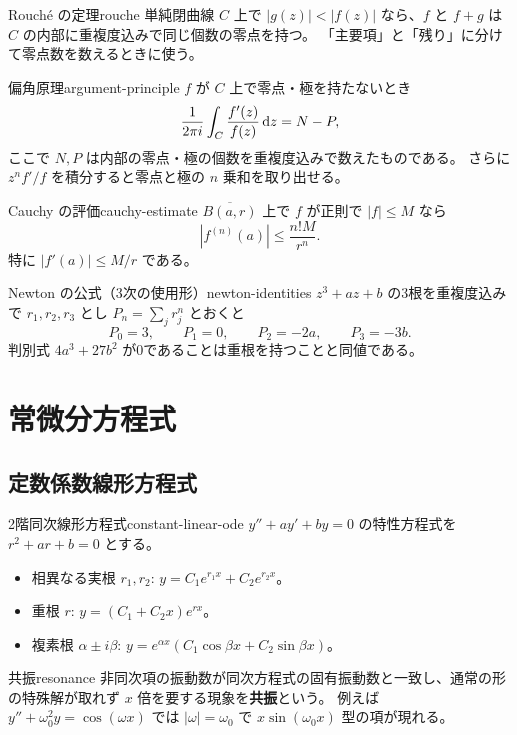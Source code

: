 \begin{theorem}{Rouché の定理}{rouche}
単純閉曲線 $C$ 上で $|g(z)|<|f(z)|$ なら、$f$ と $f+g$ は $C$ の内部に重複度込みで同じ個数の零点を持つ。
「主要項」と「残り」に分けて零点数を数えるときに使う。
\end{theorem}

\begin{theorem}{偏角原理}{argument-principle}
$f$ が $C$ 上で零点・極を持たないとき
\[
 \frac1{2\pi i}\int_C\frac{f'(z)}{f(z)}\,\mathrm{d} z=N-P,
\]
ここで $N,P$ は内部の零点・極の個数を重複度込みで数えたものである。
さらに $z^n f'/f$ を積分すると零点と極の $n$ 乗和を取り出せる。
\end{theorem}

\begin{theorem}{Cauchy の評価}{cauchy-estimate}
$\overline{B(a,r)}$ 上で $f$ が正則で $|f|\le M$ なら
\[
 |f^{(n)}(a)|\le\frac{n!M}{r^n}.
\]
特に $|f'(a)|\le M/r$ である。
\end{theorem}

\begin{proposition}{Newton の公式（3次の使用形）}{newton-identities}
$z^3+az+b$ の3根を重複度込みで $r_1,r_2,r_3$ とし $P_n=\sum_jr_j^n$ とおくと
\[
 P_0=3,\qquad P_1=0,\qquad P_2=-2a,\qquad P_3=-3b.
\]
判別式 $4a^3+27b^2$ が0であることは重根を持つことと同値である。
\end{proposition}

\chapter{常微分方程式}
\label{ch:ode}

\section{定数係数線形方程式}

\begin{theorem}{2階同次線形方程式}{constant-linear-ode}
$y''+ay'+by=0$ の特性方程式を $r^2+ar+b=0$ とする。
\begin{itemize}
  \item 相異なる実根 $r_1,r_2$: $y=C_1e^{r_1x}+C_2e^{r_2x}$。
  \item 重根 $r$: $y=(C_1+C_2x)e^{rx}$。
  \item 複素根 $\alpha\pm i\beta$: $y=e^{\alpha x}(C_1\cos\beta x+C_2\sin\beta x)$。
\end{itemize}
\end{theorem}

\begin{definition}{共振}{resonance}
非同次項の振動数が同次方程式の固有振動数と一致し、通常の形の特殊解が取れず $x$ 倍を要する現象を\textbf{共振}という。
例えば $y''+\omega_0^2y=\cos(\omega x)$ では $|\omega|=\omega_0$ で $x\sin(\omega_0x)$ 型の項が現れる。
\end{definition}

